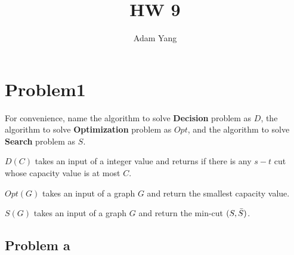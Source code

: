 \documentclass[openany]{article}
\begin{document}
\title{HW 9}
\author{Adam Yang}
\maketitle




\section*{Problem1}

For convenience, name the algorithm to solve \textbf{Decision} problem as $D$, the algorithm to solve \textbf{Optimization} problem as $Opt$, and the algorithm to solve \textbf{Search} problem as $S$.

$D(C)$ takes an input of a integer value and returns if there is any $s-t$ cut whose capacity value is at most $C$.

$Opt(G)$ takes an input of a graph $G$ and return the smallest capacity value.

$S(G)$ takes an input of a graph $G$ and return the min-cut $(S, \Bar{S})$.

\subsection*{Problem a}
\end{document}

